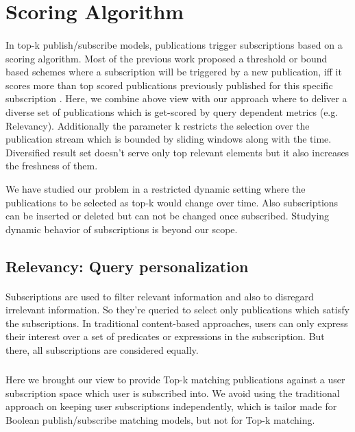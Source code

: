 \documentclass[a4paper,12pt,oneside]{book}
\theoremstyle{definition}
\theoremstyle{remark}
\begin{document}
\section{Scoring Algorithm}
\label{sec:scoring_algo}
\paragraph*{}
In top-k publish/subscribe models, publications trigger subscriptions based on a scoring algorithm. Most of the previous work proposed a threshold or bound based schemes where a subscription will be triggered by a new publication, iff it scores more than top scored publications previously published for this specific subscription \cite{Shraer2013}. Here, we combine above view with our approach where to deliver a diverse set of publications which is get-scored by query dependent metrics (e.g. Relevancy). Additionally the parameter k restricts the selection over the publication stream which is bounded by sliding windows along with the time. Diversified result set doesn't serve only top relevant elements but it also increases the freshness of them.


We have studied our problem in a restricted dynamic setting where the publications to be selected as top-k would change over time. Also subscriptions can be inserted or deleted but can not be changed once subscribed. Studying dynamic behavior of subscriptions is beyond our scope.

\subsection{Relevancy: Query personalization}
\label{sec:relevancy}
\paragraph*{}
Subscriptions are used to filter relevant information and also to disregard irrelevant information. So they're queried to select only publications which satisfy the subscriptions. In traditional content-based approaches, users can only express their interest over a set of predicates or expressions in the subscription. But there, all subscriptions are considered equally. 
\subparagraph*{}
Here we brought our view to provide Top-k matching publications against a user subscription space which user is subscribed into. We avoid using the traditional approach on keeping user subscriptions independently, which is tailor made for Boolean publish/subscribe matching models, but not for Top-k matching.
\end{document}
